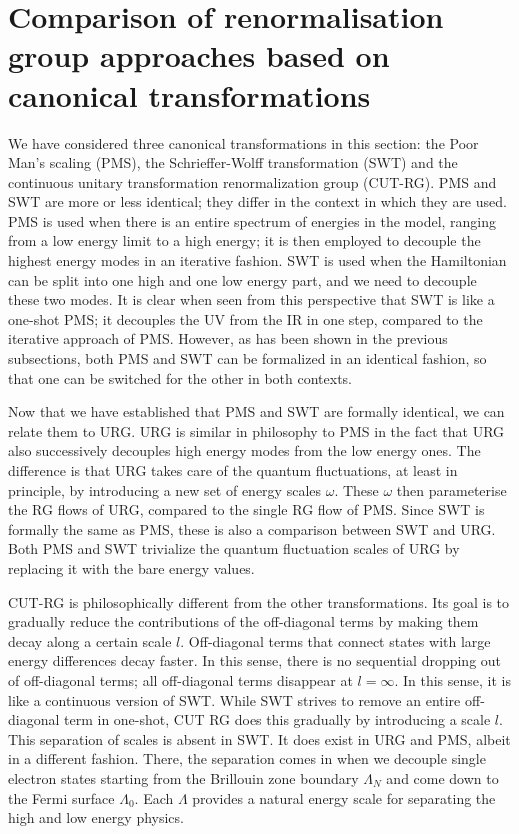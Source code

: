 \section{Comparison of renormalisation group approaches based on canonical transformations}
We have considered three canonical transformations in this section: the Poor Man's scaling (PMS), the Schrieffer-Wolff transformation (SWT) and the continuous unitary transformation renormalization group (CUT-RG). PMS and SWT are more or less identical; they differ in the context in which they are used. PMS is used when there is an entire spectrum of energies in the model, ranging from a low energy limit to a high energy; it is then employed to decouple the highest energy modes in an iterative fashion. SWT is used when the Hamiltonian can be split into one high and one low energy part, and we need to decouple these two modes. It is clear when seen from this perspective that SWT is like a one-shot PMS; it decouples the UV from the IR in one step, compared to the iterative approach of PMS. However, as has been shown in the previous subsections, both PMS and SWT can be formalized in an identical fashion, so that one can be switched for the other in both contexts.

Now that we have established that PMS and SWT are formally identical, we can relate them to URG. URG is similar in philosophy to PMS in the fact that URG also successively decouples high energy modes from the low energy ones. The difference is that URG takes care of the quantum fluctuations, at least in principle, by introducing a new set of energy scales \(\omega\). These \(\omega\) then parameterise the RG flows of URG, compared to the single RG flow of PMS. Since SWT is formally the same as PMS, these is also a comparison between SWT and URG. Both PMS and SWT trivialize the quantum fluctuation scales of URG by replacing it with the bare energy values.

CUT-RG is philosophically different from the other transformations. Its goal is to gradually reduce the contributions of the off-diagonal terms by making them decay along a certain scale \(l\). Off-diagonal terms that connect states with large energy differences decay faster. In this sense, there is no sequential dropping out of off-diagonal terms; all off-diagonal terms disappear at \(l=\infty\). In this sense, it is like a continuous version of SWT. While SWT strives to remove an entire off-diagonal term in one-shot, CUT RG does this gradually by introducing a scale \(l\). This separation of scales is absent in SWT. It does exist in URG and PMS, albeit in a different fashion. There, the separation comes in when we decouple single electron states starting from the Brillouin zone boundary \(\Lambda_N\) and come down to the Fermi surface \(\Lambda_0\). Each \(\Lambda\) provides a natural energy scale for separating the high and low energy physics.

